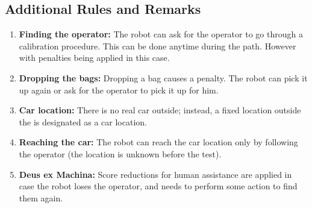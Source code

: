 \subsection*{Additional Rules and Remarks}
\begin{enumerate}[nosep]

    \item \textbf{Finding the operator:} The robot can ask for the operator to go through a calibration procedure. This can be done anytime during the path. However with penalties being applied in this case.
    \item \textbf{Dropping the bags:} Dropping a bag causes a penalty. The robot can pick it up again or ask for the operator to pick it up for him.
	\item \textbf{Car location:} There is no real car outside; instead, a fixed location outside the \Arena{} is designated as a car location.
	\item \textbf{Reaching the car:} The robot can reach the car location only by following the operator (the location is unknown before the test).
	\item \textbf{Deus ex Machina:} Score reductions for human assistance are applied in case the robot loses the operator, and needs to perform some action to find them again. %
\end{enumerate}


